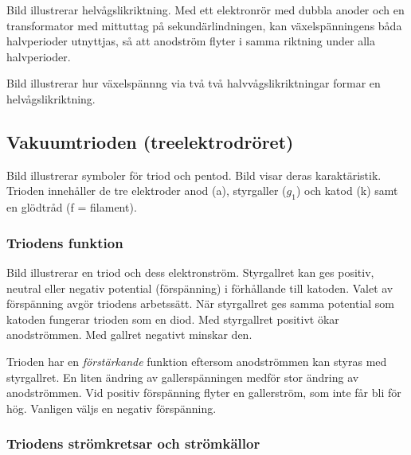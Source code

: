 Bild  illustrerar helvågslikriktning.
Med ett el\-ek\-tron\-rör med dubbla anoder och en transformator med mittuttag på
sekundärlindningen, kan växelspänningens båda halvperioder utnyttjas, så att
anodström flyter i samma riktning under alla halvperioder.


Bild  illustrerar hur växelspännng via två
två halvvågslikriktningar formar en helvågslikriktning.

\subsection{Vakuumtrioden (treelektrodröret)}

Bild  illustrerar symboler för triod och pentod.
Bild  visar deras karaktäristik.
Trioden innehåller de tre elektroder anod (a), styrgaller (\(g_1\)) och katod
(k) samt en glödtråd (f = filament).

\newpage
{}



\subsubsection{Triodens funktion}

Bild  illustrerar en triod och dess elektronström.
Styrgallret kan ges positiv, neutral eller negativ potential (förspänning) i
förhållande till katoden.
Valet av förspänning avgör triodens arbetssätt.
När styrgallret ges samma potential som katoden fungerar trioden som en diod.
Med styrgallret positivt ökar anodströmmen.
Med gallret negativt minskar den.

Trioden har en \emph{förstärkande} funktion eftersom anodströmmen kan styras med
styrgallret.
En liten ändring av gallerspänningen medför stor ändring av anodströmmen.
Vid positiv förspänning flyter en gallerström, som inte får bli för hög.
Vanligen väljs en negativ förspänning.

\subsubsection{Triodens strömkretsar och strömkällor}

